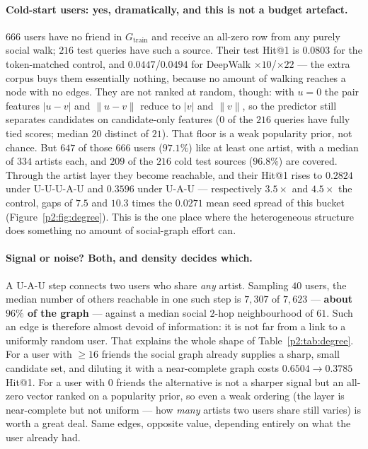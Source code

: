 \paragraph{Cold-start users: yes, dramatically, and this is not a budget artefact.}
$666$ users have no friend in $G_{\mathrm{train}}$ and receive an all-zero row from any
purely social walk; $216$ test queries have such a source.  Their test Hit@1 is $0.0803$ for
the token-matched control, and $0.0447$/$0.0494$ for DeepWalk $\times10$/$\times22$ --- the
extra corpus buys them essentially nothing, because no amount of walking reaches a node with
no edges.  They are not ranked at random, though: with $u=0$ the pair features $|u-v|$ and
$\lVert u-v\rVert$ reduce to $|v|$ and $\lVert v\rVert$, so the predictor still separates
candidates on candidate-only features ($0$ of the $216$ queries have fully tied scores;
median $20$ distinct of $21$).  That floor is a weak popularity prior, not chance.  But $647$
of those $666$ users ($97.1\%$) like at least one artist, with a median of $334$ artists
each, and $209$ of the $216$ cold test sources ($96.8\%$) are covered.  Through the artist
layer they become reachable, and their Hit@1 rises to $0.2824$ under \textsf{U-U-U-A-U} and
$0.3596$ under \textsf{U-A-U} --- respectively $3.5\times$ and $4.5\times$ the control, gaps
of $7.5$ and $10.3$ times the $0.0271$ mean seed spread of this bucket
(Figure~\ref{p2:fig:degree}).  This is the one place where the heterogeneous structure does
something no amount of social-graph effort can.

\paragraph{Signal or noise? Both, and density decides which.}
A \textsf{U-A-U} step connects two users who share \emph{any} artist.  Sampling $40$ users,
the median number of others reachable in one such step is $7{,}307$ of $7{,}623$ ---
\textbf{about $96\%$ of the graph} --- against a median social $2$-hop neighbourhood of
$61$.  Such an edge is therefore almost devoid of information: it is not far from a link to
a uniformly random user.  That explains the whole shape of Table~\ref{p2:tab:degree}.  For a
user with $\ge16$ friends the social graph already supplies a sharp, small candidate set,
and diluting it with a near-complete graph costs $0.6504 \to 0.3785$ Hit@1.  For a user with
$0$ friends the alternative is not a sharper signal but an all-zero vector ranked on a
popularity prior, so even a weak ordering (the layer is near-complete but not uniform ---
how \emph{many} artists two users share still varies) is worth a great deal.  Same edges, opposite value,
depending entirely on what the user already had.

